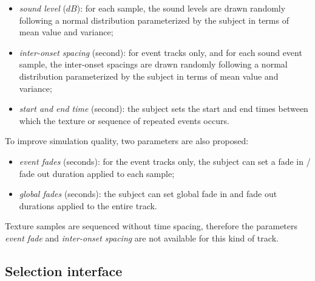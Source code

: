 \documentclass[12pt]{elsarticle}
\begin{document}
\begin{itemize}
\item \emph{sound level} ($dB$): for each sample, the sound levels are drawn randomly following a normal distribution parameterized by the subject in terms of mean value and variance;
\item \emph{inter-onset spacing} (second): for event tracks only, and for each sound event sample, the inter-onset spacings are drawn randomly following a normal distribution parameterized by the subject in terms of mean value and variance;
\item \emph{start and end time} (second): the subject sets the start and end times between which the texture or sequence of repeated events occurs.
\end{itemize}


To improve simulation quality, two parameters are also proposed:


\begin{itemize}
\item \emph{event fades} (seconds): for the event tracks only, the subject can set a fade in / fade out duration applied to each sample;
\item \emph{global fades} (seconds): the subject can set global fade in and fade out durations applied to the entire track.
\end{itemize}


Texture samples are sequenced without time spacing, therefore the parameters \emph{event fade} and \emph{inter-onset spacing} are not available for this kind of track.

\subsection{Selection interface}
\label{sec:simscene_ssf}
\end{document}
